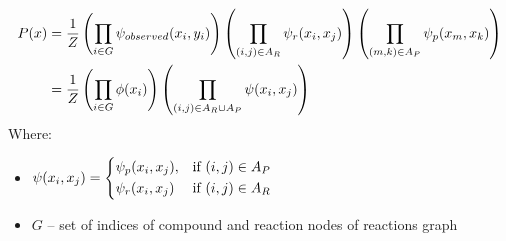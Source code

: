 \documentclass[10pt]{article}
\begin{document}
\begin{equation}
    \begin{split}
    P(x) &= {1 \over Z} \left( \prod_{i \in G} \psi_{observed}(x_i, y_i) \right) \left( \prod_{(i,j) \in A_R} \psi_{r}(x_i, x_j) \right) \left( \prod_{(m,k) \in A_P} \psi_{p}(x_m, x_k) \right) \\
            &= {1 \over Z} \left( \prod_{i \in G} \phi(x_i) \right) \left( \prod_{(i,j) \in A_R \cup A_P} \psi(x_i, x_j) \right)
    \end{split}
\end{equation}
Where:  
\begin{itemize}
    \item 
    $ 
    \psi(x_i, x_j)= 
    \begin{dcases}
        \psi_p(x_i, x_j),& \text{if } (i, j) \in A_P \\
        \psi_r(x_i, x_j) & \text{if } (i, j) \in A_R
    \end{dcases}
    $
    
    \item $G$ -- set of indices of compound and reaction nodes of reactions graph \\
\end{itemize}
\end{document}
